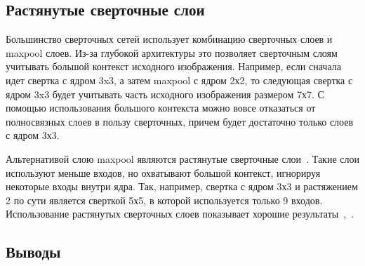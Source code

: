 \subsection{Растянутые сверточные слои}

Большинство сверточных сетей использует комбинацию сверточных слоев и maxpool слоев. Из-за глубокой архитектуры это позволяет сверточным слоям учитывать большой контекст исходного изображения. Например, если сначала идет свертка с ядром 3x3, а затем maxpool с ядром 2х2, то следующая свертка с ядром 3x3 будет учитывать часть исходного изображения размером 7х7. С помощью использования большого контекста можно вовсе отказаться от полносвязных слоев в пользу сверточных, причем будет достаточно только слоев с ядром 3х3.

Альтернативой слою maxpool являются растянутые сверточные слои~\cite{dilated_conv}. Такие слои используют меньше входов, но охватывают большой контекст, игнорируя некоторые входы внутри ядра. Так, например, свертка с ядром 3х3 и растяжением 2 по сути является сверткой 5х5, в которой используется только 9 входов. Использование растянутых сверточных слоев показывает хорошие результаты~\cite{segm_dcnn_crf},~\cite{deeplab}.


\iffalse
\subsection{DeepLab}
\fi

\subsection{Выводы}
